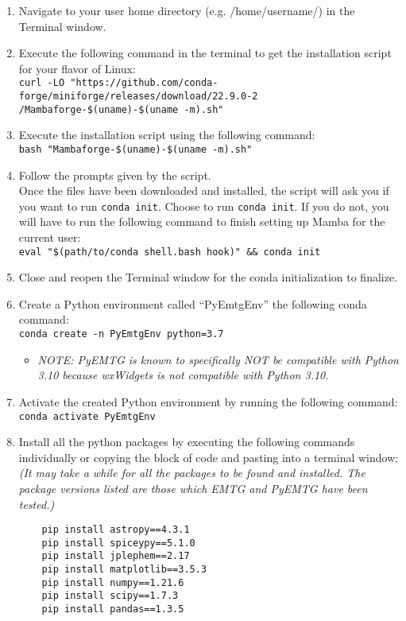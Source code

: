 \begin{enumerate}
	\item Navigate to your user home directory (e.g. /home/username/) in the Terminal window.
	\item Execute the following command in the terminal to get the installation script for your flavor of Linux: \\

	\texttt{curl -LO "https://github.com/conda-forge/miniforge/releases/download/22.9.0-2 \newline /Mambaforge-\$(uname)-\$(uname -m).sh"}

	\item Execute the installation script using the following command: \\

	\texttt{bash "Mambaforge-\$(uname)-\$(uname -m).sh"}

	\item Follow the prompts given by the script. \\ Once the files have been downloaded and installed, the script will ask you if you want to run \texttt{conda init}. Choose to run \texttt{conda init}. If you do not, you will have to run the following command to finish setting up Mamba for the current user: \\
	\texttt{eval "\$(path/to/conda shell.bash hook)" \&\& conda init}
	
	\item Close and reopen the Terminal window for the conda initialization to finalize.

	\item Create a Python environment called ``PyEmtgEnv'' the following conda command: \\

	\texttt{conda create -n PyEmtgEnv python=3.7}
	\begin{itemize}
		\item \textit{NOTE: PyEMTG is known to specifically NOT be compatible with Python 3.10 because wxWidgets is not compatible with Python 3.10.}
	\end{itemize}
	
	\item Activate the created Python environment by running the following command: \\
	\texttt{conda activate PyEmtgEnv}
	
	\item Install all the python packages by executing the following commands individually or copying the block of code and pasting into a terminal window: \\
	\textit{(It may take a while for all the packages to be found and installed. The package versions listed are those which \ac{EMTG} and PyEMTG have been tested.)}
	\begin{verbatim}
	pip install astropy==4.3.1
	pip install spiceypy==5.1.0
	pip install jplephem==2.17
	pip install matplotlib==3.5.3
	pip install numpy==1.21.6
	pip install scipy==1.7.3
	pip install pandas==1.3.5
	\end{verbatim}
	

\end{enumerate}
